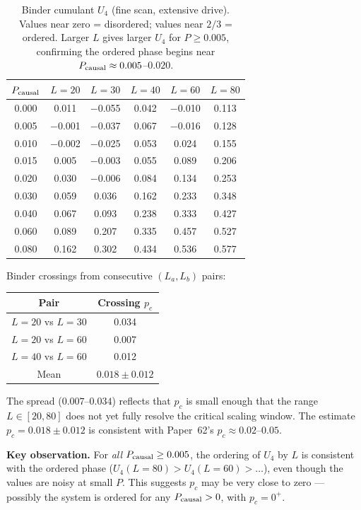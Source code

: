 \documentclass[12pt,a4paper]{article}
\begin{document}
\begin{table}[h]
\centering
\caption{Binder cumulant $U_4$ (fine scan, extensive drive). Values near zero = disordered;
values near $2/3$ = ordered. Larger $L$ gives larger $U_4$ for $P \geq 0.005$,
confirming the ordered phase begins near $P_{\rm causal} \approx 0.005$--$0.020$.}
\label{tab:u4}
\begin{tabular}{cccccc}
\toprule
$P_{\rm causal}$ & $L=20$ & $L=30$ & $L=40$ & $L=60$ & $L=80$ \\
\midrule
0.000 & 0.011 & $-$0.055 & 0.042 & $-$0.010 & 0.113 \\
0.005 & $-$0.001 & $-$0.037 & 0.067 & $-$0.016 & 0.128 \\
0.010 & $-$0.002 & $-$0.025 & 0.053 & 0.024 & 0.155 \\
0.015 & 0.005 & $-$0.003 & 0.055 & 0.089 & 0.206 \\
0.020 & 0.030 & $-$0.006 & 0.084 & 0.134 & 0.253 \\
0.030 & 0.059 & 0.036 & 0.162 & 0.233 & 0.348 \\
0.040 & 0.067 & 0.093 & 0.238 & 0.333 & 0.427 \\
0.060 & 0.089 & 0.207 & 0.335 & 0.457 & 0.527 \\
0.080 & 0.162 & 0.302 & 0.434 & 0.536 & 0.577 \\
\bottomrule
\end{tabular}
\end{table}

Binder crossings from consecutive $(L_a, L_b)$ pairs:
\begin{center}
\begin{tabular}{cc}
\toprule
Pair & Crossing $p_c$ \\
\midrule
$L=20$ vs $L=30$ & 0.034 \\
$L=20$ vs $L=60$ & 0.007 \\
$L=40$ vs $L=60$ & 0.012 \\
\midrule
Mean & $0.018 \pm 0.012$ \\
\bottomrule
\end{tabular}
\end{center}

The spread ($0.007$--$0.034$) reflects that $p_c$ is small enough that the
range $L \in [20, 80]$ does not yet fully resolve the critical scaling window.
The estimate $p_c = 0.018 \pm 0.012$ is consistent with Paper~62's $p_c \approx 0.02$--$0.05$.

\textbf{Key observation.}
For \emph{all} $P_{\rm causal} \geq 0.005$, the ordering of $U_4$ by $L$
is consistent with the ordered phase ($U_4(L=80) > U_4(L=60) > \ldots$),
even though the values are noisy at small $P$.
This suggests $p_c$ may be very close to zero --- possibly the system is ordered
for any $P_{\rm causal} > 0$, with $p_c = 0^+$.
\end{document}
